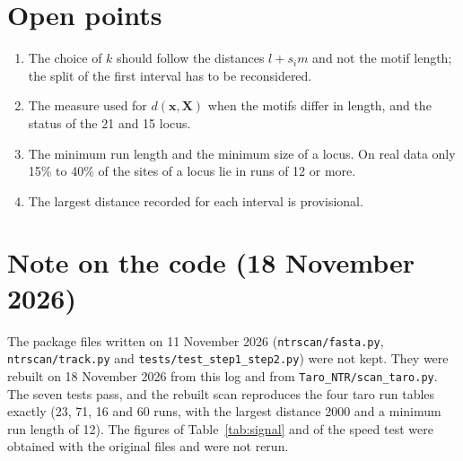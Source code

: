 \documentclass[11pt,a4paper]{article}
\begin{document}
\section{Open points}
\begin{enumerate}
\item The choice of $k$ should follow the distances $l+s_im$ and not the motif
      length; the split of the first interval has to be reconsidered.
\item The measure used for $d(\mathbf{x},\mathbf{X})$ when the motifs differ in
      length, and the status of the 21 and 15 locus.
\item The minimum run length and the minimum size of a locus. On real data only
      15\% to 40\% of the sites of a locus lie in runs of 12 or more.
\item The largest distance recorded for each interval is provisional.
\end{enumerate}

\section{Note on the code (18 November 2026)}
The package files written on 11 November 2026 (\texttt{ntrscan/fasta.py},
\texttt{ntrscan/track.py} and \texttt{tests/test\_step1\_step2.py}) were not kept.
They were rebuilt on 18 November 2026 from this log and from
\texttt{Taro\_NTR/scan\_taro.py}. The seven tests pass, and the rebuilt scan
reproduces the four taro run tables exactly (23, 71, 16 and 60 runs, with the
largest distance 2000 and a minimum run length of 12). The figures of
Table~\ref{tab:signal} and of the speed test were obtained with the original
files and were not rerun.
\end{document}
